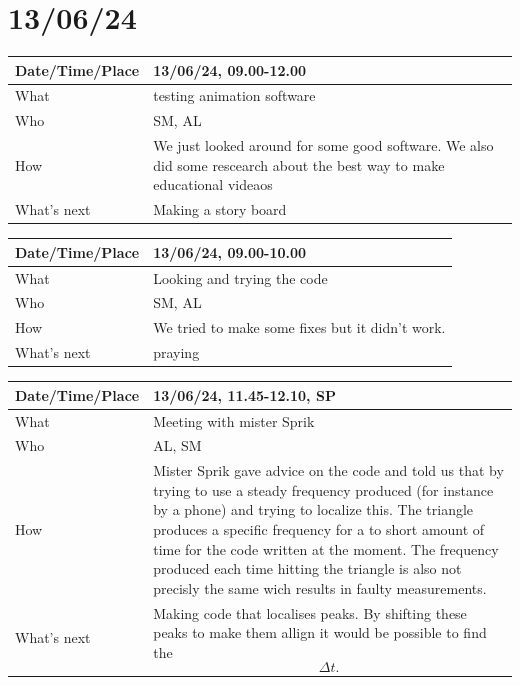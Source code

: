 \documentclass{article}
\begin{document}
\section{13/06/24}

\begin{table}[H]
\begin{tabular}{|p{1.5in}|p{4in}|}
\hline
Date/Time/Place &  13/06/24, 09.00-12.00\\ \hline
What            &  testing animation software\\ \hline
Who             &  SM, AL\\ \hline
How             &  We just looked around for some good software. We also did some rescearch about the best way to make educational videaos\\ \hline
What's next     & Making a story board\\ \hline
\end{tabular}
\end{table}

\begin{table}[H]
\begin{tabular}{|p{1.5in}|p{4in}|}
\hline
Date/Time/Place &  13/06/24, 09.00-10.00\\ \hline
What            &  Looking and trying the code\\ \hline
Who             &  SM, AL\\ \hline
How             &  We tried to make some fixes but it didn't work.\\ \hline
What's next     &  praying\\ \hline
\end{tabular}
\end{table}

\begin{table}[H]
\begin{tabular}{|p{1.5in}|p{4in}|}
\hline
Date/Time/Place & 13/06/24, 11.45-12.10, SP \\ \hline
What            & Meeting with mister Sprik \\ \hline
Who             & AL, SM \\ \hline
How             & Mister Sprik gave advice on the code and told us that by trying to use a steady frequency produced (for instance by a phone) and trying to localize this. The triangle produces a specific frequency for a to short amount of time for the code written at the moment. The frequency produced each time hitting the triangle is also not precisly the same wich results in faulty measurements.   \\ \hline
What's next     & Making code that localises peaks. By shifting these peaks to make them allign it would be possible to find the $$\Delta t.$$ \\ \hline
\end{tabular}
\end{table}
\end{document}
